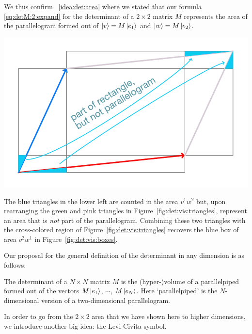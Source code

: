 \bigskip
We thus confirm \bigidearef{}~\ref{idea:det:area} where we stated that our formula \eqref{eq:detM:2:expand} for the determinant of a $2\times 2$ matrix $M$ represents the area of the parallelogram formed out of $\left|v\right\rangle=M\left|e_1\right\rangle$ and $\left|w\right\rangle = M\left|e_2\right\rangle$.

\begin{marginfigure}%
    \includegraphics[width=\textwidth]{figures/det TwoPiecesofDetExtraTeal.pdf}
    \caption{The blue triangles in the lower left are counted in the area $v^1w^2$ but, upon rearranging the green and pink triangles in Figure~\ref{fig:det:vis:triangles}, represent an area that is \emph{not} part of the parallelogram. Combining these two triangles with the cross-colored region of Figure~\ref{fig:det:vis:triangles} recovers the blue box of area $v^2w^1$ in Figure~\ref{fig:det:vis:boxes}.}
    \label{fig:det:vis:extra}
\end{marginfigure}


Our proposal for the general definition of the determinant in any dimension is as follows:
\begin{bigidea}\label{idea:det:volume}
The determinant of a $N\times N$ matrix $M$ is the (hyper-)volume of a parallelpiped formed out of the vectors $M\left|e_1\right\rangle$, $\cdots$, $M\left|e_N\right\rangle$. Here `parallelpiped' is the $N$-dimensional version of a two-dimensional parallelogram.
\end{bigidea}
In order to go from the $2\times 2$ area that we have shown here to higher dimensions, we introduce another big idea: the Levi-Civita symbol.


